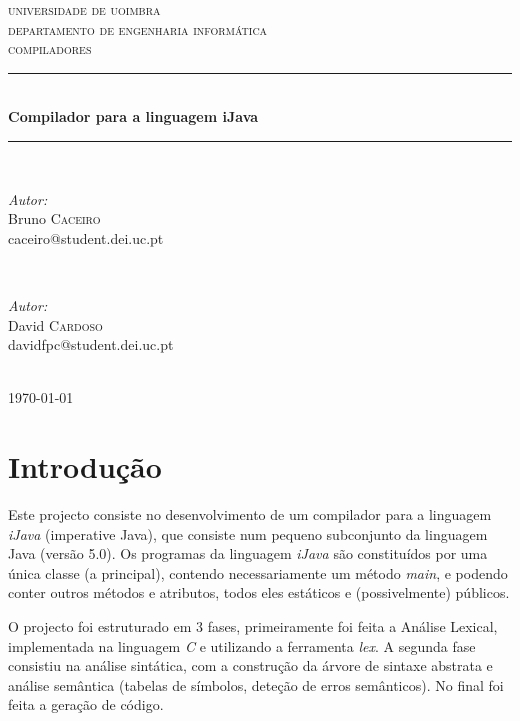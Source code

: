 \documentclass[12pt]{article}
\begin{document}
\begin{titlepage}

\newcommand{\HRule}{\rule{\linewidth}{0.5mm}} 
\center 
 

\textsc{\LARGE universidade de uoimbra}\\[1.5cm] %
\textsc{\Large departamento de engenharia informática}\\[4cm] %
\textsc{\large compiladores}\\[1cm] %


\HRule \\[0.5cm]
{ \huge \bfseries Compilador para a linguagem iJava}\\[0.4cm] 
\HRule \\[8cm]
 
\begin{minipage}{0.4\textwidth}
\begin{flushleft} \large
\emph{Autor:}\\
Bruno \textsc{Caceiro}  \\caceiro@student.dei.uc.pt
\end{flushleft}
\end{minipage}
~
\begin{minipage}{0.4\textwidth}
\begin{flushright} \large
\emph{Autor:} \\
David \textsc{Cardoso}  \\davidfpc@student.dei.uc.pt
\end{flushright}
\end{minipage}\\[2cm]



{\large \today}\\[3cm]

\vfill

\end{titlepage}



\section{Introdução}
Este projecto consiste no desenvolvimento de um compilador para a linguagem \emph{iJava} (imperative Java), que consiste num pequeno subconjunto da linguagem Java (versão 5.0). Os programas da linguagem \emph{iJava} são constituídos por uma única classe (a principal), contendo necessariamente um método \emph{main}, e podendo conter outros métodos e atributos, todos eles estáticos e (possivelmente) públicos.

O projecto foi estruturado em 3 fases, primeiramente foi feita a Análise Lexical, implementada na linguagem \emph{C} e utilizando a ferramenta \emph{lex}. A segunda fase consistiu na análise sintática, com a  construção da árvore de sintaxe abstrata e análise semântica (tabelas de símbolos, deteção de erros semânticos). No final foi feita a geração de código.



	
	
\end{document}
